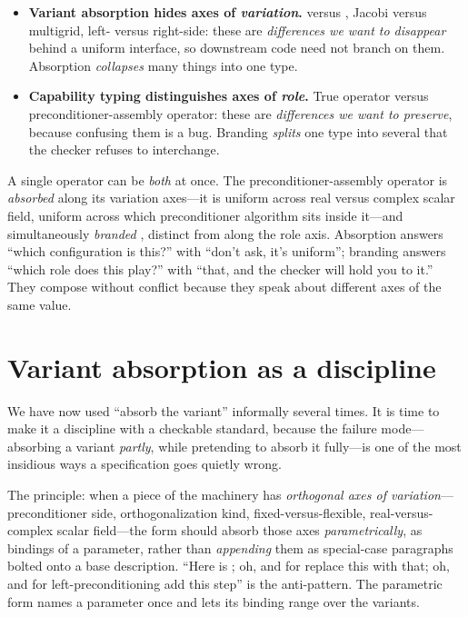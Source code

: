 \begin{itemize}[nosep]
  \item \textbf{Variant absorption hides axes of \emph{variation}.}  versus
  , Jacobi versus multigrid, left- versus right-side: these are
  \emph{differences we want to disappear} behind a uniform interface, so downstream
  code need not branch on them. Absorption \emph{collapses} many things into one type.
  \item \textbf{Capability typing distinguishes axes of \emph{role}.} True operator
  versus preconditioner-assembly operator: these are \emph{differences we want to
  preserve}, because confusing them is a bug. Branding \emph{splits} one type into
  several that the checker refuses to interchange.
\end{itemize}

A single operator can be \emph{both} at once. The preconditioner-assembly operator is
\emph{absorbed} along its variation axes---it is uniform across real versus complex
scalar field, uniform across which preconditioner algorithm sits inside it---and
simultaneously \emph{branded} , distinct from  along
the role axis. Absorption answers ``which configuration is this?'' with ``don't ask,
it's uniform''; branding answers ``which role does this play?'' with ``that, and the
checker will hold you to it.'' They compose without conflict because they speak about
different axes of the same value.

\section{Variant absorption as a discipline}

We have now used ``absorb the variant'' informally several times. It is time to make
it a discipline with a checkable standard, because the failure mode---absorbing a
variant \emph{partly}, while pretending to absorb it fully---is one of the most
insidious ways a specification goes quietly wrong.

The principle: when a piece of the machinery has \emph{orthogonal axes of
variation}---preconditioner side, orthogonalization kind, fixed-versus-flexible,
real-versus-complex scalar field---the form should absorb those axes
\emph{parametrically}, as bindings of a parameter, rather than \emph{appending} them
as special-case paragraphs bolted onto a base description. ``Here is ;
oh, and for  replace this with that; oh, and for left-preconditioning add
this step'' is the anti-pattern. The parametric form names a parameter once and lets
its binding range over the variants.

